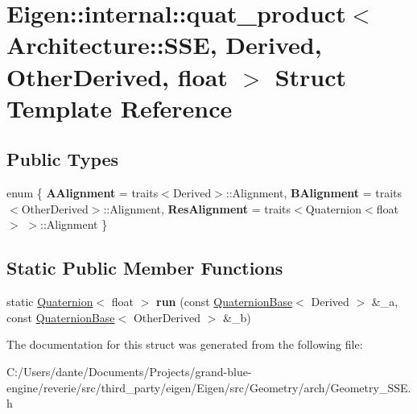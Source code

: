 \hypertarget{struct_eigen_1_1internal_1_1quat__product_3_01_architecture_1_1_s_s_e_00_01_derived_00_01_other_derived_00_01float_01_4}{}\section{Eigen\+::internal\+::quat\+\_\+product$<$ Architecture\+::S\+SE, Derived, Other\+Derived, float $>$ Struct Template Reference}
\label{struct_eigen_1_1internal_1_1quat__product_3_01_architecture_1_1_s_s_e_00_01_derived_00_01_other_derived_00_01float_01_4}
\subsection*{Public Types}
\begin{DoxyCompactItemize}
\item 
\mbox{\label{struct_eigen_1_1internal_1_1quat__product_3_01_architecture_1_1_s_s_e_00_01_derived_00_01_other_derived_00_01float_01_4_ac654f9cd5cce8751ea41ae104d502991}} 
enum \{ {\bfseries A\+Alignment} = traits$<$Derived$>$\+::Alignment, 
{\bfseries B\+Alignment} = traits$<$Other\+Derived$>$\+::Alignment, 
{\bfseries Res\+Alignment} = traits$<$Quaternion$<$float$>$ $>$\+::Alignment
 \}
\end{DoxyCompactItemize}
\subsection*{Static Public Member Functions}
\begin{DoxyCompactItemize}
\item 
\mbox{\label{struct_eigen_1_1internal_1_1quat__product_3_01_architecture_1_1_s_s_e_00_01_derived_00_01_other_derived_00_01float_01_4_af3cb75670326cf2046e624b8b11c0971}} 
static \mbox{\hyperlink{class_eigen_1_1_quaternion}{Quaternion}}$<$ float $>$ {\bfseries run} (const \mbox{\hyperlink{class_eigen_1_1_quaternion_base}{Quaternion\+Base}}$<$ Derived $>$ \&\+\_\+a, const \mbox{\hyperlink{class_eigen_1_1_quaternion_base}{Quaternion\+Base}}$<$ Other\+Derived $>$ \&\+\_\+b)
\end{DoxyCompactItemize}


The documentation for this struct was generated from the following file\+:\begin{DoxyCompactItemize}
\item 
C\+:/\+Users/dante/\+Documents/\+Projects/grand-\/blue-\/engine/reverie/src/third\+\_\+party/eigen/\+Eigen/src/\+Geometry/arch/Geometry\+\_\+\+S\+S\+E.\+h\end{DoxyCompactItemize}
